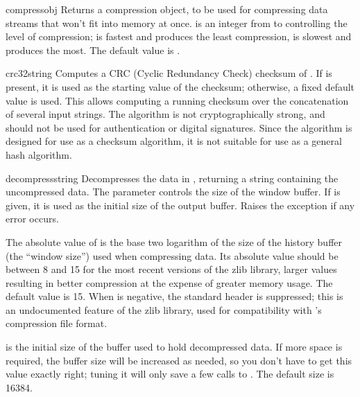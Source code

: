 \begin{funcdesc}{compressobj}{}
  Returns a compression object, to be used for compressing data streams
  that won't fit into memory at once.   is an integer from
   to  controlling the level of compression;  is
  fastest and produces the least compression,  is slowest and
  produces the most.  The default value is .
\end{funcdesc}

\begin{funcdesc}{crc32}{string}
  Computes a CRC (Cyclic Redundancy Check)%
  checksum of . If
   is present, it is used as the starting value of the
  checksum; otherwise, a fixed default value is used.  This allows
  computing a running checksum over the concatenation of several
  input strings.  The algorithm is not cryptographically strong, and
  should not be used for authentication or digital signatures.  Since
  the algorithm is designed for use as a checksum algorithm, it is not
  suitable for use as a general hash algorithm.
\end{funcdesc}

\begin{funcdesc}{decompress}{string}
  Decompresses the data in , returning a string containing
  the uncompressed data.  The  parameter controls the size of
  the window buffer.  If  is given, it is used as the
  initial size of the output buffer.  Raises the 
  exception if any error occurs.

The absolute value of  is the base two logarithm of the
size of the history buffer (the ``window size'') used when compressing
data.  Its absolute value should be between 8 and 15 for the most
recent versions of the zlib library, larger values resulting in better
compression at the expense of greater memory usage.  The default value
is 15.  When  is negative, the standard
 header is suppressed; this is an undocumented feature
of the zlib library, used for compatibility with 's
compression file format.

 is the initial size of the buffer used to hold
decompressed data.  If more space is required, the buffer size will be
increased as needed, so you don't have to get this value exactly
right; tuning it will only save a few calls to .  The
default size is 16384.
   
\end{funcdesc}

